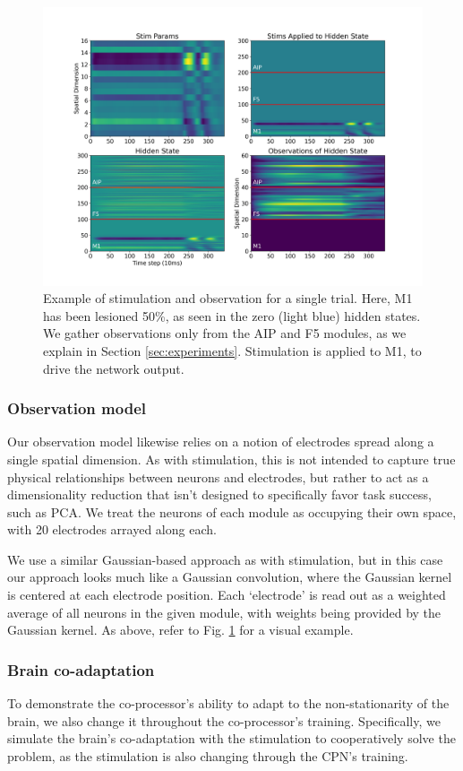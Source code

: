 \documentclass[12pt]{iopart}
\begin{document}
\begin{figure}[h]
	\centering
	\includegraphics[width=\textwidth]{stim_and_obs.png}
	\caption{Example of stimulation and observation for a single trial. Here, M1
	has been lesioned 50\%, as seen in the zero (light blue) hidden states. We
	gather observations only from the AIP and F5 modules, as we explain in
	Section \ref{sec:experiments}. Stimulation is applied to M1, to drive the
	network output.}
	\label{fig:stim_and_obs}
\end{figure}

\subsubsection{Observation model}
Our observation model likewise relies on a notion of electrodes spread along
a single spatial dimension. As with stimulation, this is not intended to
capture true physical relationships between neurons and electrodes, but
rather to act as a dimensionality reduction that isn't designed to specifically
favor task success, such as PCA. We treat the neurons of each module as
occupying their own space, with 20 electrodes arrayed along each.

We use a similar Gaussian-based approach as with stimulation, but in this
case our approach looks much like a Gaussian convolution, where the Gaussian
kernel is centered at each electrode position. Each `electrode' is read out
as a weighted average of all neurons in the given module, with weights being
provided by the Gaussian kernel. As above, refer to Fig. \ref{fig:stim_and_obs}
for a visual example.

\subsubsection{Brain co-adaptation}
To demonstrate the co-processor's ability to adapt to the non-stationarity
of the brain, we also change it throughout the co-processor's training.
Specifically, we simulate the brain's co-adaptation with the stimulation
to cooperatively solve the problem, as the stimulation is also changing
through the CPN's training.
\end{document}

